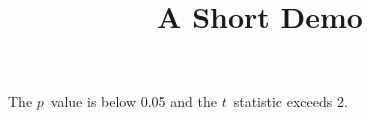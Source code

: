 \documentclass[article]{jss}
\title{A Short Demo}
\begin{document}
The $p$~value is below 0.05 and the $t$~statistic exceeds 2.
\end{document}
